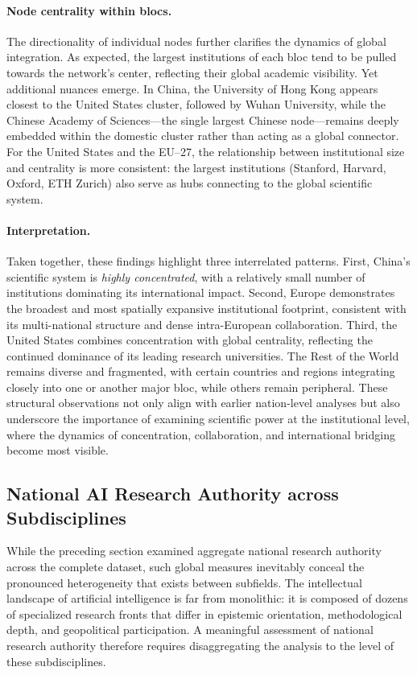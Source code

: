 \documentclass{article}
\begin{document}
\paragraph{Node centrality within blocs.} 
The directionality of individual nodes further clarifies the dynamics of global integration. As expected, the largest institutions of each bloc tend to be pulled towards the network’s center, reflecting their global academic visibility. Yet additional nuances emerge. In China, the University of Hong Kong appears closest to the United States cluster, followed by Wuhan University, while the Chinese Academy of Sciences---the single largest Chinese node---remains deeply embedded within the domestic cluster rather than acting as a global connector. For the United States and the EU--27, the relationship between institutional size and centrality is more consistent: the largest institutions (Stanford, Harvard, Oxford, ETH Zurich) also serve as hubs connecting to the global scientific system.

\paragraph{Interpretation.} 
Taken together, these findings highlight three interrelated patterns. First, China’s scientific system is \textit{highly concentrated}, with a relatively small number of institutions dominating its international impact. Second, Europe demonstrates the broadest and most spatially expansive institutional footprint, consistent with its multi-national structure and dense intra-European collaboration. Third, the United States combines concentration with global centrality, reflecting the continued dominance of its leading research universities. The Rest of the World remains diverse and fragmented, with certain countries and regions integrating closely into one or another major bloc, while others remain peripheral. These structural observations not only align with earlier nation-level analyses but also underscore the importance of examining scientific power at the institutional level, where the dynamics of concentration, collaboration, and international bridging become most visible.


\subsection{National AI Research Authority across Subdisciplines}

While the preceding section examined aggregate national research authority across the complete dataset, such global measures inevitably conceal the pronounced heterogeneity that exists between subfields. The intellectual landscape of artificial intelligence is far from monolithic: it is composed of dozens of specialized research fronts that differ in epistemic orientation, methodological depth, and geopolitical participation. A meaningful assessment of national research authority therefore requires disaggregating the analysis to the level of these subdisciplines.
\end{document}
